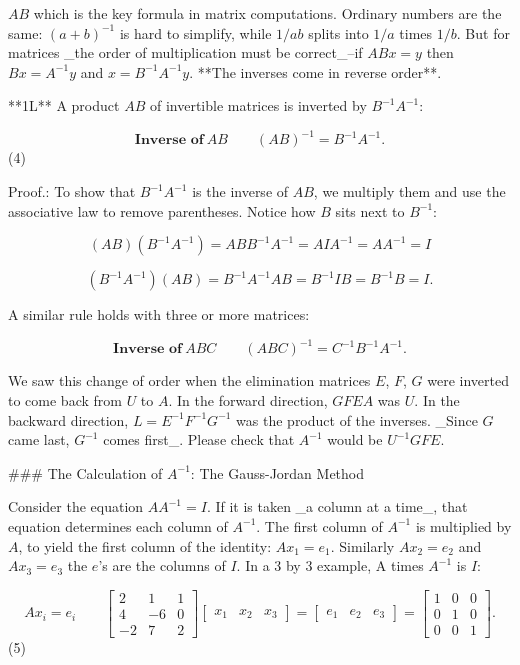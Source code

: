 \(AB\) which is the key formula in matrix computations. Ordinary numbers are the same: \((a+b)^{-1}\) is hard to simplify, while \(1/ab\) splits into \(1/a\) times \(1/b\). But for matrices _the order of multiplication must be correct_--if \(ABx=y\) then \(Bx=A^{-1}y\) and \(x=B^{-1}A^{-1}y\). **The inverses come in reverse order**.

**1L** A product \(AB\) of invertible matrices is inverted by \(B^{-1}A^{-1}\):

\[\textbf{Inverse of}\ AB\qquad(AB)^{-1}=B^{-1}A^{-1}.\] (4)

Proof.: To show that \(B^{-1}A^{-1}\) is the inverse of \(AB\), we multiply them and use the associative law to remove parentheses. Notice how \(B\) sits next to \(B^{-1}\):

\[(AB)(B^{-1}A^{-1})=ABB^{-1}A^{-1}=AIA^{-1}=AA^{-1}=I\]

\[(B^{-1}A^{-1})(AB)=B^{-1}A^{-1}AB=B^{-1}IB=B^{-1}B=I.\]

A similar rule holds with three or more matrices:

\[\textbf{Inverse of}\ ABC\qquad(ABC)^{-1}=C^{-1}B^{-1}A^{-1}.\]

We saw this change of order when the elimination matrices \(E\), \(F\), \(G\) were inverted to come back from \(U\) to \(A\). In the forward direction, \(GFEA\) was \(U\). In the backward direction, \(L=E^{-1}F^{-1}G^{-1}\) was the product of the inverses. _Since \(G\) came last, \(G^{-1}\) comes first_. Please check that \(A^{-1}\) would be \(U^{-1}GFE\).

### The Calculation of \(A^{-1}\): The Gauss-Jordan Method

Consider the equation \(AA^{-1}=I\). If it is taken _a column at a time_, that equation determines each column of \(A^{-1}\). The first column of \(A^{-1}\) is multiplied by \(A\), to yield the first column of the identity: \(Ax_{1}=e_{1}\). Similarly \(Ax_{2}=e_{2}\) and \(Ax_{3}=e_{3}\) the \(e\)'s are the columns of \(I\). In a 3 by 3 example, A times \(A^{-1}\) is \(I\):

\[Ax_{i}=e_{i}\qquad\begin{bmatrix}2&1&1\\ 4&-6&0\\ -2&7&2\end{bmatrix}\begin{bmatrix}x_{1}&x_{2}&x_{3}\end{bmatrix}=\begin{bmatrix} e_{1}&e_{2}&e_{3}\end{bmatrix}=\begin{bmatrix}1&0&0\\ 0&1&0\\ 0&0&1\end{bmatrix}.\] (5)

